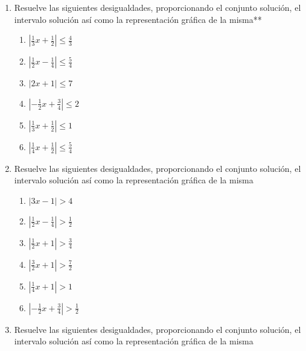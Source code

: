 \documentclass[12pt]{article}
\theoremstyle{plain}
\theoremstyle{definition}
\theoremstyle{remark}
\begin{document}
{\begin{enumerate}
  \begin{enumerate}
  \def\labelenumii{\arabic{enumii}.}
  \setcounter{enumii}{2}
  \item
    \(|3x-1|<7\)
  \item
    \(|x-2|<4\)
  \item
    \(|\frac{3}{2}x+1|<5\)
  \item
    \(|2x+1|<6\)
  \item
    \(|\frac{1}{4}x+1|<\frac{7}{2}\)
  \item
    \(|\frac{1}{3}x+\frac{1}{2}|<\frac{5}{6}\)
  \end{enumerate}
\item
  Resuelve las siguientes desigualdades, proporcionando el conjunto  solución, el intervalo solución así como la representación gráfica de  la misma**

  \begin{enumerate}
  \def\labelenumii{\arabic{enumii}.}
  \setcounter{enumii}{3}
  \item
    \(|\frac{1}{3}x+\frac{1}{2}|\leq \frac{4}{3}\)
  \item
    \(|\frac{1}{2}x-\frac{1}{4}|\leq \frac{5}{4}\)
  \item
    \(|2x+1|\leq 7\)
  \item
    \(|-\frac{1}{2}x+\frac{3}{4}|\leq 2\)
  \item
    \(|\frac{1}{3}x+\frac{1}{2}|\leq 1\)
  \item
    \(|\frac{1}{4}x+\frac{1}{2}|\leq \frac{5}{4}\)
  \end{enumerate}
\item
  Resuelve las siguientes desigualdades, proporcionando el conjunto  solución, el intervalo solución así como la representación gráfica de  la misma

  \begin{enumerate}
  \def\labelenumii{\arabic{enumii}.}
  \item
    \(|3x-1|>4\)
  \item
    \(|\frac{1}{2}x-\frac{1}{4}|>\frac{1}{2}\)
  \item
    \(|\frac{1}{2}x+1|>\frac{3}{4}\)
  \item
    \(|\frac{3}{2}x+1|>\frac{7}{2}\)
  \item
    \(|\frac{1}{4}x+1|>1\)
  \item
    \(|-\frac{1}{2}x+\frac{3}{4}|>\frac{1}{2}\)
  \end{enumerate}
\item
  Resuelve las siguientes desigualdades, proporcionando el conjunto  solución, el intervalo solución así como la representación gráfica de   la misma


\end{enumerate}}
\end{document}
